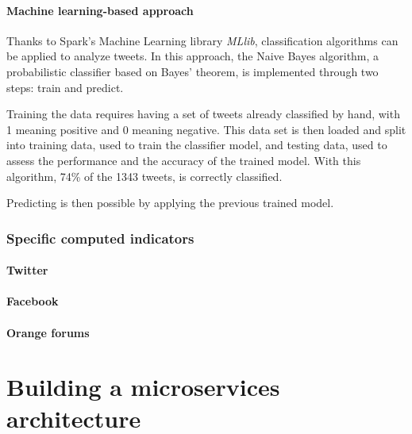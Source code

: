 \documentclass[11pt]{article}
\begin{document}
\paragraph{Machine learning-based approach}

Thanks to Spark's Machine Learning library \textit{MLlib}, classification algorithms can be applied to analyze tweets. In this approach, the Naive Bayes algorithm, a probabilistic classifier based on Bayes' theorem, is implemented through two steps: train and predict.

Training the data requires having a set of tweets already classified by hand, with 1 meaning positive and 0 meaning negative. This data set is then loaded and split into training data, used to train the classifier model, and testing data, used to assess the performance and the accuracy of the trained model.
With this algorithm, 74\% of the 1343 tweets, is correctly classified.

Predicting is then possible by applying the previous trained model.

\subsubsection{Specific computed indicators}

\paragraph{Twitter}


\paragraph{Facebook}

\paragraph{Orange forums}


\section{Building a microservices architecture}

\end{document}
